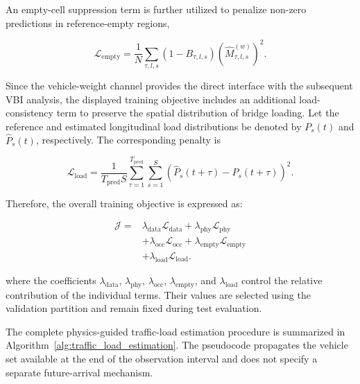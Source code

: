 \documentclass[journal]{IEEEtran}
\begin{document}
An empty-cell suppression term is further utilized to penalize non-zero predictions in reference-empty regions,

\begin{equation}
\mathcal{L}_{\mathrm{empty}}
=
\frac{1}{N}
\sum_{\tau,l,s}
\left(
1-B_{\tau,l,s}
\right)
\left(
\widehat{M}_{\tau,l,s}^{(w)}
\right)^2.
\end{equation}

Since the vehicle-weight channel provides the direct interface with the subsequent VBI analysis, the displayed training objective includes an additional load-consistency term to preserve the spatial distribution of bridge loading. Let the reference and estimated longitudinal load distributions be denoted by $P_s(t)$ and $\widehat{P}_s(t)$, respectively. The corresponding penalty is

\begin{equation}
\mathcal{L}_{\mathrm{load}}
=
\frac{1}{T_{\mathrm{pred}}S}
\sum_{\tau=1}^{T_{\mathrm{pred}}}
\sum_{s=1}^{S}
\left(
\widehat{P}_{s}(t+\tau)
-
P_{s}(t+\tau)
\right)^2.
\end{equation}

Therefore, the overall training objective is expressed as:

\begin{equation}
\begin{aligned}
\mathcal{J}
={}&
\lambda_{\mathrm{data}}\mathcal{L}_{\mathrm{data}}
+
\lambda_{\mathrm{phy}}\mathcal{L}_{\mathrm{phy}}
\\
&+
\lambda_{\mathrm{occ}}\mathcal{L}_{\mathrm{occ}}
+
\lambda_{\mathrm{empty}}\mathcal{L}_{\mathrm{empty}}
\\
&+
\lambda_{\mathrm{load}}\mathcal{L}_{\mathrm{load}}.
\end{aligned}
\end{equation}

where the coefficients $\lambda_{\mathrm{data}}$, $\lambda_{\mathrm{phy}}$, $\lambda_{\mathrm{occ}}$, $\lambda_{\mathrm{empty}}$, and $\lambda_{\mathrm{load}}$ control the relative contribution of the individual terms. Their values are selected using the validation partition and remain fixed during test evaluation.

The complete physics-guided traffic-load estimation procedure is summarized in Algorithm~\ref{alg:traffic_load_estimation}. The pseudocode propagates the vehicle set available at the end of the observation interval and does not specify a separate future-arrival mechanism.
\end{document}
